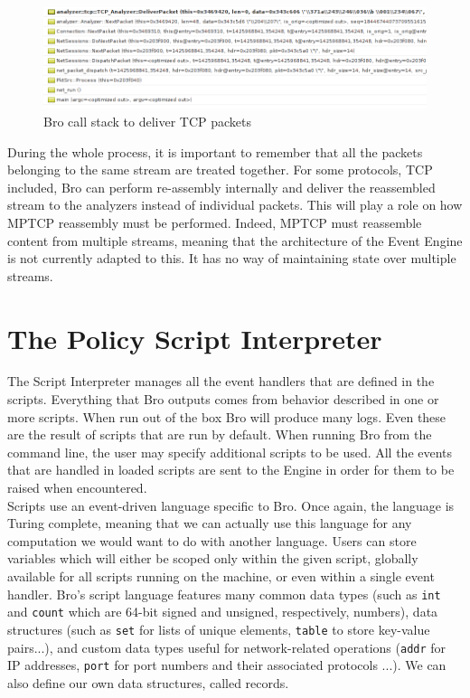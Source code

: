 \begin{figure}[!t]
\centering
\includegraphics[width = \textwidth]{Figures/brodebug.png}
\caption{Bro call stack to deliver TCP packets}
\label{pic:callstack}
\end{figure}

During the whole process, it is important to remember that all the packets belonging to the same stream are treated together. For some protocols, TCP included, Bro can perform re-assembly internally and deliver the reassembled stream to the analyzers instead of individual packets. This will play a role on how MPTCP reassembly must be performed. Indeed, MPTCP must reassemble content from multiple streams, meaning that the architecture of the Event Engine is not currently adapted to this. It has no way of maintaining state over multiple streams.


\section{The Policy Script Interpreter}
The Script Interpreter manages all the event handlers that are defined in the scripts. Everything that Bro outputs comes from behavior described in one or more scripts. When run out of the box Bro will produce many logs. Even these are the result of scripts that are run by default. When running Bro from the command line, the user may specify additional scripts to be used. All the events that are handled in loaded scripts are sent to the Engine in order for them to be raised when encountered. \\

Scripts use an event-driven language specific to Bro. Once again, the language is Turing complete, meaning that we can actually use this language for any computation we would want to do with another language. Users can store variables which will either be scoped only within the given script, globally available for all scripts running on the machine, or even within a single event handler. Bro's script language features many common data types (such as \texttt{int} and \texttt{count}  which are 64-bit signed and unsigned, respectively, numbers), data structures (such as \texttt{set} for lists of unique elements, \texttt{table} to store key-value pairs...), and custom data types useful for network-related operations (\texttt{addr} for IP addresses, \texttt{port} for port numbers and their associated protocols ...). We can also define our own data structures, called records. \\

